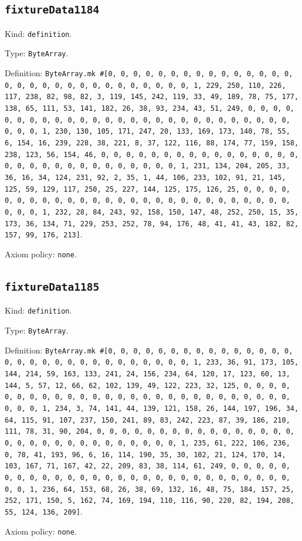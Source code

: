 \documentclass[11pt]{article}
\begin{document}
\subsection*{\texttt{fixtureData1184}}
\noindent Kind: \texttt{definition}.\par
\noindent Type: \texttt{ByteArray}.\par
\noindent Definition: \texttt{ByteArray.mk \#[0, 0, 0, 0, 0, 0, 0, 0, 0, 0, 0, 0, 0, 0, 0, 0, 0, 0, 0, 0, 0, 0, 0, 0, 0, 0, 0, 0, 0, 0, 1, 229, 250, 110, 226, 117, 238, 82, 98, 82, 3, 119, 145, 242, 119, 33, 49, 189, 78, 75, 177, 138, 65, 111, 53, 141, 182, 26, 38, 93, 234, 43, 51, 249, 0, 0, 0, 0, 0, 0, 0, 0, 0, 0, 0, 0, 0, 0, 0, 0, 0, 0, 0, 0, 0, 0, 0, 0, 0, 0, 0, 0, 0, 0, 1, 230, 130, 105, 171, 247, 20, 133, 169, 173, 140, 78, 55, 6, 154, 16, 239, 228, 38, 221, 8, 37, 122, 116, 88, 174, 77, 159, 158, 238, 123, 56, 154, 46, 0, 0, 0, 0, 0, 0, 0, 0, 0, 0, 0, 0, 0, 0, 0, 0, 0, 0, 0, 0, 0, 0, 0, 0, 0, 0, 0, 0, 0, 0, 1, 231, 134, 204, 205, 33, 36, 16, 34, 124, 231, 92, 2, 35, 1, 44, 106, 233, 102, 91, 21, 145, 125, 59, 129, 117, 250, 25, 227, 144, 125, 175, 126, 25, 0, 0, 0, 0, 0, 0, 0, 0, 0, 0, 0, 0, 0, 0, 0, 0, 0, 0, 0, 0, 0, 0, 0, 0, 0, 0, 0, 0, 0, 0, 1, 232, 28, 84, 243, 92, 158, 150, 147, 48, 252, 250, 15, 35, 173, 36, 134, 71, 229, 253, 252, 78, 94, 176, 48, 41, 41, 43, 182, 82, 157, 99, 176, 213]}.\par
\noindent Axiom policy: \texttt{none}.\par
\subsection*{\texttt{fixtureData1185}}
\noindent Kind: \texttt{definition}.\par
\noindent Type: \texttt{ByteArray}.\par
\noindent Definition: \texttt{ByteArray.mk \#[0, 0, 0, 0, 0, 0, 0, 0, 0, 0, 0, 0, 0, 0, 0, 0, 0, 0, 0, 0, 0, 0, 0, 0, 0, 0, 0, 0, 0, 0, 1, 233, 36, 91, 173, 105, 144, 214, 59, 163, 133, 241, 24, 156, 234, 64, 120, 17, 123, 60, 13, 144, 5, 57, 12, 66, 62, 102, 139, 49, 122, 223, 32, 125, 0, 0, 0, 0, 0, 0, 0, 0, 0, 0, 0, 0, 0, 0, 0, 0, 0, 0, 0, 0, 0, 0, 0, 0, 0, 0, 0, 0, 0, 0, 1, 234, 3, 74, 141, 44, 139, 121, 158, 26, 144, 197, 196, 34, 64, 115, 91, 107, 237, 150, 241, 89, 83, 242, 223, 87, 39, 186, 210, 111, 78, 31, 90, 204, 0, 0, 0, 0, 0, 0, 0, 0, 0, 0, 0, 0, 0, 0, 0, 0, 0, 0, 0, 0, 0, 0, 0, 0, 0, 0, 0, 0, 0, 0, 1, 235, 61, 222, 106, 236, 0, 78, 41, 193, 96, 6, 16, 114, 190, 35, 30, 102, 21, 124, 170, 14, 103, 167, 71, 167, 42, 22, 209, 83, 38, 114, 61, 249, 0, 0, 0, 0, 0, 0, 0, 0, 0, 0, 0, 0, 0, 0, 0, 0, 0, 0, 0, 0, 0, 0, 0, 0, 0, 0, 0, 0, 0, 0, 1, 236, 64, 153, 68, 26, 38, 69, 132, 16, 48, 75, 184, 157, 25, 252, 171, 150, 5, 162, 74, 169, 194, 110, 116, 90, 220, 82, 194, 208, 55, 124, 136, 209]}.\par
\noindent Axiom policy: \texttt{none}.\par
\end{document}
